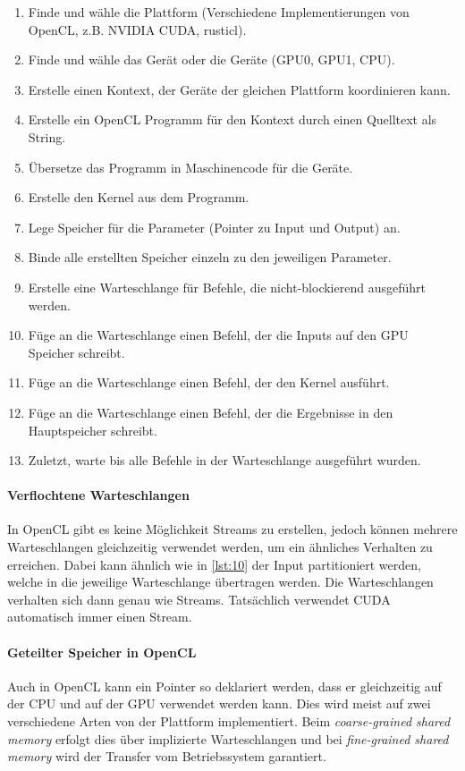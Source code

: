 \begin{enumerate}
    \item Finde und wähle die Plattform (Verschiedene Implementierungen von OpenCL, z.B. NVIDIA CUDA, rusticl).
    \item Finde und wähle das Gerät oder die Geräte (GPU0, GPU1, CPU).
    \item Erstelle einen Kontext, der Geräte der gleichen Plattform koordinieren kann.
    \item Erstelle ein OpenCL Programm für den Kontext durch einen Quelltext als String.
    \item Übersetze das Programm in Maschinencode für die Geräte.
    \item Erstelle den Kernel aus dem Programm.
    \item Lege Speicher für die Parameter (Pointer zu Input und Output) an.
    \item Binde alle erstellten Speicher einzeln zu den jeweiligen Parameter.
    \item Erstelle eine Warteschlange für Befehle, die nicht-blockierend ausgeführt werden.
    \item Füge an die Warteschlange einen Befehl, der die Inputs auf den GPU Speicher schreibt.
    \item Füge an die Warteschlange einen Befehl, der den Kernel ausführt.
    \item Füge an die Warteschlange einen Befehl, der die Ergebnisse in den Hauptspeicher schreibt.
    \item Zuletzt, warte bis alle Befehle in der Warteschlange ausgeführt wurden.
\end{enumerate}

\paragraph{Verflochtene Warteschlangen}
In OpenCL gibt es keine Möglichkeit Streams zu erstellen, jedoch können mehrere Warteschlangen gleichzeitig verwendet werden, um ein ähnliches Verhalten zu erreichen.
Dabei kann ähnlich wie in \autoref{lst:10} der Input partitioniert werden, welche in die jeweilige Warteschlange übertragen werden.
Die Warteschlangen verhalten sich dann genau wie Streams.
Tatsächlich verwendet CUDA automatisch immer einen Stream.

\paragraph{Geteilter Speicher in OpenCL}
Auch in OpenCL kann ein Pointer so deklariert werden, dass er gleichzeitig auf der CPU und auf der GPU verwendet werden kann.
Dies wird meist auf zwei verschiedene Arten von der Plattform implementiert.
Beim \emph{coarse-grained shared memory} erfolgt dies über implizierte Warteschlangen und bei \emph{fine-grained shared memory} wird der Transfer vom Betriebssystem garantiert.

